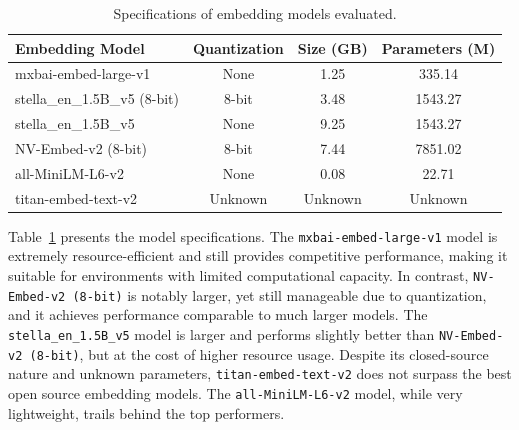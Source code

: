 \documentclass[pdflatex,sn-mathphys-num]{sn-jnl}%
\theoremstyle{thmstyleone}%
\theoremstyle{thmstyletwo}%
\theoremstyle{thmstylethree}%
\begin{document}
\begin{table}[h]
\centering
\begin{tabular}{|l|c|c|c|}
\hline
\textbf{Embedding Model} & \textbf{Quantization} & \textbf{Size (GB)} & \textbf{Parameters (M)} \\ \hline
mxbai-embed-large-v1      & None   & 1.25 & 335.14 \\ \hline
stella\_en\_1.5B\_v5 (8-bit) & 8-bit & 3.48 & 1543.27 \\ \hline
stella\_en\_1.5B\_v5         & None  & 9.25 & 1543.27 \\ \hline
NV-Embed-v2 (8-bit)       & 8-bit & 7.44 & 7851.02 \\ \hline
all-MiniLM-L6-v2          & None  & 0.08 & 22.71 \\ \hline
titan-embed-text-v2       & Unknown & Unknown & Unknown \\ \hline
\end{tabular}
\caption{Specifications of embedding models evaluated.}
\label{table:model_specs}
\end{table}


Table~\ref{table:model_specs} presents the model specifications. The \texttt{mxbai-embed-large-v1} model is extremely resource-efficient and still provides competitive performance, making it suitable for environments with limited computational capacity. In contrast, \texttt{NV-Embed-v2 (8-bit)} is notably larger, yet still manageable due to quantization, and it achieves performance comparable to much larger models. The \texttt{stella\_en\_1.5B\_v5} model is larger and performs slightly better than \texttt{NV-Embed-v2 (8-bit)}, but at the cost of higher resource usage. Despite its closed-source nature and unknown parameters, \texttt{titan-embed-text-v2} does not surpass the best open source embedding models. The \texttt{all-MiniLM-L6-v2} model, while very lightweight, trails behind the top performers.
\end{document}
